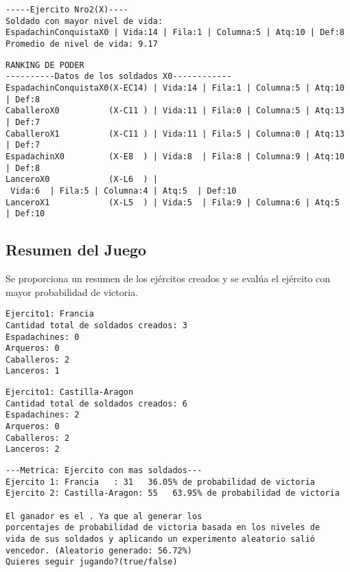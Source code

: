 \begin{lstlisting}[language=plaintext]
-----Ejercito Nro2(X)----
Soldado con mayor nivel de vida:
EspadachinConquistaX0 | Vida:14 | Fila:1 | Columna:5 | Atq:10 | Def:8
Promedio de nivel de vida: 9.17
\end{lstlisting}

\begin{lstlisting}[language=plaintext]
RANKING DE PODER
----------Datos de los soldados X0------------
EspadachinConquistaX0(X-EC14) | Vida:14 | Fila:1 | Columna:5 | Atq:10 | Def:8
CaballeroX0          (X-C11 ) | Vida:11 | Fila:0 | Columna:5 | Atq:13 | Def:7
CaballeroX1          (X-C11 ) | Vida:11 | Fila:5 | Columna:0 | Atq:13 | Def:7
EspadachinX0         (X-E8  ) | Vida:8  | Fila:8 | Columna:9 | Atq:10 | Def:8
LanceroX0            (X-L6  ) |
 Vida:6  | Fila:5 | Columna:4 | Atq:5  | Def:10
LanceroX1            (X-L5  ) | Vida:5  | Fila:9 | Columna:6 | Atq:5  | Def:10
\end{lstlisting}

\subsection{Resumen del Juego}
Se proporciona un resumen de los ejércitos creados y se evalúa el ejército con mayor probabilidad de victoria.

\begin{lstlisting}[language=plaintext]
Ejercito1: Francia
Cantidad total de soldados creados: 3
Espadachines: 0
Arqueros: 0
Caballeros: 2
Lanceros: 1
\end{lstlisting}

\begin{lstlisting}[language=plaintext]
Ejercito1: Castilla-Aragon
Cantidad total de soldados creados: 6
Espadachines: 2
Arqueros: 0
Caballeros: 2
Lanceros: 2
\end{lstlisting}

\begin{lstlisting}[language=plaintext]
---Metrica: Ejercito con mas soldados---
Ejercito 1: Francia   : 31   36.05% de probabilidad de victoria
Ejercito 2: Castilla-Aragon: 55   63.95% de probabilidad de victoria

El ganador es el . Ya que al generar los
porcentajes de probabilidad de victoria basada en los niveles de
vida de sus soldados y aplicando un experimento aleatorio salió
vencedor. (Aleatorio generado: 56.72%)
Quieres seguir jugando?(true/false)
\end{lstlisting}

